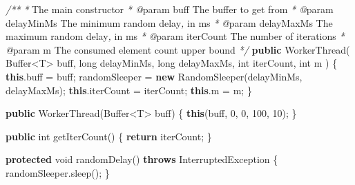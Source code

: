 \documentclass[11pt]{article}
\newenvironment{Shaded}{}{}
\newcommand{\KeywordTok}[1]{\textcolor[rgb]{0.00,0.44,0.13}{\textbf{{#1}}}}
\newcommand{\DataTypeTok}[1]{\textcolor[rgb]{0.56,0.13,0.00}{{#1}}}
\newcommand{\DecValTok}[1]{\textcolor[rgb]{0.25,0.63,0.44}{{#1}}}
\newcommand{\CommentTok}[1]{\textcolor[rgb]{0.38,0.63,0.69}{\textit{{#1}}}}
\newcommand{\FunctionTok}[1]{\textcolor[rgb]{0.02,0.16,0.49}{{#1}}}
\newcommand{\NormalTok}[1]{{#1}}
\newcommand{\ControlFlowTok}[1]{\textcolor[rgb]{0.00,0.44,0.13}{\textbf{{#1}}}}
\newcommand{\OperatorTok}[1]{\textcolor[rgb]{0.40,0.40,0.40}{{#1}}}
\newcommand{\BuiltInTok}[1]{{#1}}
\begin{document}
\begin{Shaded}
\begin{Highlighting}[]
    \CommentTok{/**}
     \CommentTok{*}\NormalTok{ The main constructor}
\CommentTok{     * @}\NormalTok{param buff The buffer to get from}
     \CommentTok{*} \CommentTok{@}\NormalTok{param delayMinMs The minimum random delay}\CommentTok{,}\NormalTok{ in ms}
     \CommentTok{*} \CommentTok{@}\NormalTok{param delayMaxMs The maximum random delay}\CommentTok{,}\NormalTok{ in ms}
     \CommentTok{*} \CommentTok{@}\NormalTok{param iterCount The number of iterations}
     \CommentTok{*} \CommentTok{@}\NormalTok{param m The consumed element count upper bound}
     \CommentTok{*/}
    \KeywordTok{public} \FunctionTok{WorkerThread}\OperatorTok{(}
            \BuiltInTok{Buffer}\OperatorTok{\textless{}}\NormalTok{T}\OperatorTok{\textgreater{}}\NormalTok{ buff}\OperatorTok{,}
            \DataTypeTok{long}\NormalTok{ delayMinMs}\OperatorTok{,} \DataTypeTok{long}\NormalTok{ delayMaxMs}\OperatorTok{,}
            \DataTypeTok{int}\NormalTok{ iterCount}\OperatorTok{,} \DataTypeTok{int}\NormalTok{ m}
    \OperatorTok{)} \OperatorTok{\{}
        \KeywordTok{this}\OperatorTok{.}\FunctionTok{buff} \OperatorTok{=}\NormalTok{ buff}\OperatorTok{;}
\NormalTok{        randomSleeper }\OperatorTok{=} \KeywordTok{new} \FunctionTok{RandomSleeper}\OperatorTok{(}\NormalTok{delayMinMs}\OperatorTok{,}\NormalTok{ delayMaxMs}\OperatorTok{);}
        \KeywordTok{this}\OperatorTok{.}\FunctionTok{iterCount} \OperatorTok{=}\NormalTok{ iterCount}\OperatorTok{;}
        \KeywordTok{this}\OperatorTok{.}\FunctionTok{m} \OperatorTok{=}\NormalTok{ m}\OperatorTok{;}
    \OperatorTok{\}}

    \KeywordTok{public} \FunctionTok{WorkerThread}\OperatorTok{(}\BuiltInTok{Buffer}\OperatorTok{\textless{}}\NormalTok{T}\OperatorTok{\textgreater{}}\NormalTok{ buff}\OperatorTok{)} \OperatorTok{\{}
        \KeywordTok{this}\OperatorTok{(}\NormalTok{buff}\OperatorTok{,} \DecValTok{0}\OperatorTok{,} \DecValTok{0}\OperatorTok{,} \DecValTok{100}\OperatorTok{,} \DecValTok{10}\OperatorTok{);}
    \OperatorTok{\}}

    \KeywordTok{public} \DataTypeTok{int} \FunctionTok{getIterCount}\OperatorTok{()} \OperatorTok{\{}
        \ControlFlowTok{return}\NormalTok{ iterCount}\OperatorTok{;}
    \OperatorTok{\}}

    \KeywordTok{protected} \DataTypeTok{void} \FunctionTok{randomDelay}\OperatorTok{()} \KeywordTok{throws} \BuiltInTok{InterruptedException} \OperatorTok{\{}
\NormalTok{        randomSleeper}\OperatorTok{.}\FunctionTok{sleep}\OperatorTok{();}
    \OperatorTok{\}}


\end{Highlighting}
\end{Shaded}
\end{document}
